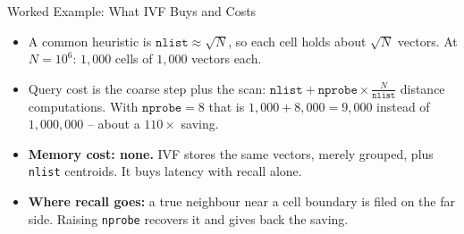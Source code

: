\begin{frame}{Worked Example: What IVF Buys and Costs}
\begin{itemize}
  \item A common heuristic is $\texttt{nlist} \approx \sqrt{N}$, so each cell holds about $\sqrt{N}$ vectors. At $N = 10^6$: $1{,}000$ cells of $1{,}000$ vectors each.
  \pause
  \item Query cost is the coarse step plus the scan: $\texttt{nlist} + \texttt{nprobe}\times\frac{N}{\texttt{nlist}}$ distance computations. With $\texttt{nprobe} = 8$ that is $1{,}000 + 8{,}000 = 9{,}000$ instead of $1{,}000{,}000$ -- about a $110\times$ saving.
  \pause
  \item \textbf{Memory cost: none.} IVF stores the same vectors, merely grouped, plus \texttt{nlist} centroids. It buys latency with recall alone.
  \pause
  \item \textbf{Where recall goes:} a true neighbour near a cell boundary is filed on the far side. Raising \texttt{nprobe} recovers it and gives back the saving.
\end{itemize}
\end{frame}

